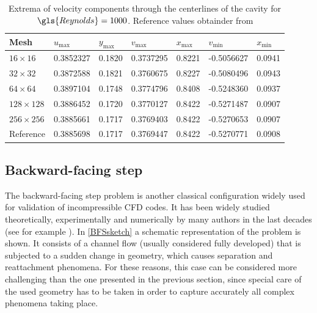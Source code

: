 \begin{table}[]
	\centering
	\begin{tabular}{lllllrr}
		\hline
		Mesh     & $u_{\text{max}}$ & $y_{\text{max}}$ & $v_{\text{max}}$ & $x_{\text{max}}$ & \multicolumn{1}{l}{$v_{\text{min}}$} & \multicolumn{1}{l}{$x_{\text{min}}$} \\ \hline
		$16\times16$        & 0.3852327        & 0.1820           & 0.3737295        & 0.8221           & -0.5056627                           & 0.0941                               \\
		$32\times32$        & 0.3872588        & 0.1821           & 0.3760675        & 0.8227           & -0.5080496                           & 0.0943                               \\
		$64\times64$       & 0.3897104        & 0.1748           & 0.3774796        & 0.8408           & -0.5248360                           & 0.0937                               \\
		$128\times128$       & 0.3886452        & 0.1720           & 0.3770127        & 0.8422           & -0.5271487                           & 0.0907                               \\
		$256\times256$       & 0.3885661        & 0.1717           & 0.3769403        & 0.8422           & -0.5270653                           & 0.0907                               \\\hline
		Reference & 0.3885698        & 0.1717           & 0.3769447        & 0.8422           & \multicolumn{1}{l}{-0.5270771}       & \multicolumn{1}{l}{0.0908}           \\ \hline
	\end{tabular}
	\caption{Extrema of velocity components through the centerlines of the cavity for $\gls{Reynolds} = 1000$. Reference values obtainder from \cite{botellaBenchmarkSpectralResults1998} }
	\label{tab:LidCavityExtrema}
\end{table}
	\FloatBarrier
\newpage

\subsection{Backward-facing step}\label{ssec:BackwardFacingStep}
The backward-facing step problem is another classical configuration widely used for validation of incompressible CFD codes. It has been widely studied theoretically, experimentally and numerically by many authors in the last decades (see for example \cite{armalyExperimentalTheoreticalInvestigation1983,barkleyThreedimensionalInstabilityFlow2000,biswasBackwardFacingStepFlows2004} ).  In \cref{BFSsketch} a schematic representation of the problem is shown. It consists of a channel flow (usually considered fully developed) that is subjected to a sudden change in geometry, which causes separation and reattachment phenomena. For these reasons, this case can be considered more challenging than the one presented in the previous section, since special care of the used geometry has to be taken in order to capture accurately all complex phenomena taking place.

